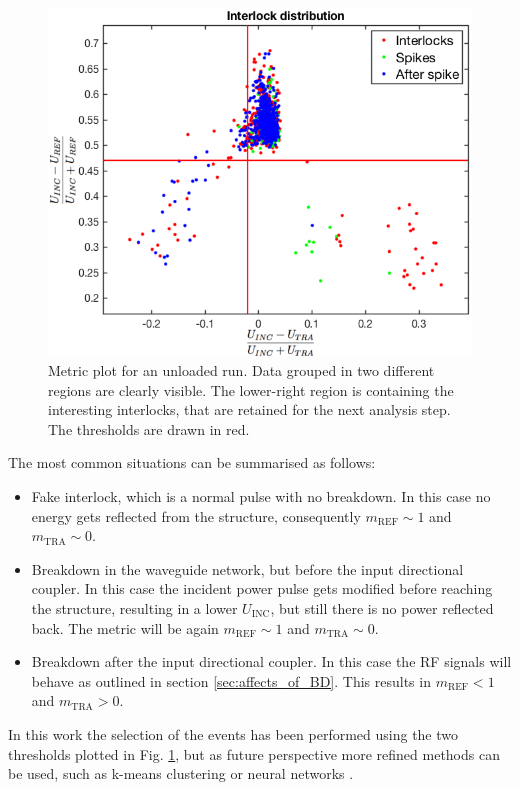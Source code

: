\begin{figure}[h]
\centering 
\includegraphics[scale=0.46]{pictures/metric_plt.png}
\caption{Metric plot for an unloaded run. Data grouped in two different regions are clearly visible. The lower-right region is containing the interesting interlocks, that are retained for the next analysis step. The thresholds are drawn in red.}
\label{Metric_plot}
\end{figure}


The most common situations can be summarised as follows:
\begin{itemize}
\item Fake interlock, which is a normal pulse with no breakdown. In this case no energy gets reflected from the structure, consequently $m_\text{REF} \sim 1$ and  $m_\text{TRA} \sim 0$.
\item Breakdown in the waveguide network, but before the input directional coupler. In this case the incident power pulse gets modified before reaching the structure, resulting in a lower $U_\text{INC}$, but still there is no power reflected back. The metric will be again $m_\text{REF} \sim 1$ and  $m_\text{TRA} \sim 0$.
\item Breakdown after the input directional coupler. In this case the RF signals will behave as outlined in section \ref{sec:affects_of_BD}. This results in $m_\text{REF} <1$ and  $m_\text{TRA} > 0$.
\end{itemize}

In this work the selection of the events has been performed using the two thresholds plotted in Fig. \ref{Metric_plot}, but as future perspective more refined methods can be used, such as k-means clustering or neural networks \cite{ML:book}.



